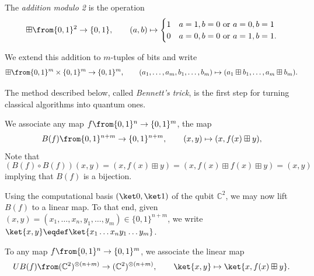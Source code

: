 \documentclass[a4paper,oneside, 12pt]{amsart}
\begin{document}
\begin{definition}\label{def:addition-modulo-2}
  The \emph{addition modulo 2} is the operation
  \begin{equation}
    \boxplus \from\{0,1\}^{2} \to\{0,1\}, \qquad (a, b) \mapsto
    \begin{cases}
      1 & a=1, b=0 \text{ or } a= 0, b=1 \\
      0 & a=0, b=0 \text{ or } a = 1, b= 1.
    \end{cases}
  \end{equation}
\end{definition}
We extend this addition to \(m\)-tuples of bits and write
\begin{equation*}
  \boxplus \from \{0,1\}^{m} \times \{0,1\}^{m} \to \{0,1\}^{m}, \qquad
  (a_{1}, \dots , a_{m}, b_{1}, \dots , b_{m}) \mapsto (a_{1} \boxplus b_{1}, \dots , a_{m} \boxplus b_{m}).
\end{equation*}

The method described below, called \emph{Bennett's trick}, is the first step for turning classical algorithms into quantum ones.

\begin{remark}\label{rmk:Bennetts-trick}
  We associate  any map \( f \from \{0,1\}^n \to \{0,1\}^m \), the map
  \begin{equation*}
    B(f) \from \{0,1\}^{n+m} \to \{0,1\}^{n+m}, \qquad (x,y) \mapsto (x, f(x) \boxplus y),
  \end{equation*}
  Note that
  \begin{equation*}
    (B(f) \circ B(f))(x,y) = (x, f(x) \boxplus y) = (x, f(x) \boxplus f(x) \boxplus y) = (x,y)
  \end{equation*}
  implying that \(B(f)\) is a bijection.
\end{remark}

Using the computational basis \(( \ket 0, \ket 1 )\) of  the qubit \( \mathbb{C}^{2}\),
we may now lift \(B(f)\) to a linear map.
To that end, given \((x,y)= (x_{1}, \dots , x_{n}, y_{1}, \dots , y_{m}) \in\{0,1\}^{n+m}\), we write
\(\ket{x,y}\eqdef \ket{x_{1}\dots x_{n}y_{1}\dots y_{m}}\).

\begin{definition}\label{def:associated-unitary}
To any map \( f \from \{0,1\}^n \to \{0,1\}^m \), we associate the linear map
\begin{equation}
    UB(f) \from (\mathbb{C}^2)^{\otimes (n+m)} \to (\mathbb{C}^2)^{\otimes (n+m)}, \qquad \ket{x,y} \mapsto \ket{x, f(x) \boxplus y}.
\end{equation}
\end{definition}
\end{document}
